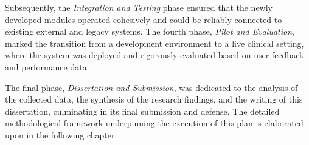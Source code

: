 Subsequently, the \textit{Integration and Testing} phase ensured that the newly developed modules operated cohesively and could be reliably connected to existing external and legacy systems. The fourth phase, \textit{Pilot and Evaluation}, marked the transition from a development environment to a live clinical setting, where the system was deployed and rigorously evaluated based on user feedback and performance data.

The final phase, \textit{Dissertation and Submission}, was dedicated to the analysis of the collected data, the synthesis of the research findings, and the writing of this dissertation, culminating in its final submission and defense. The detailed methodological framework underpinning the execution of this plan is elaborated upon in the following chapter. 